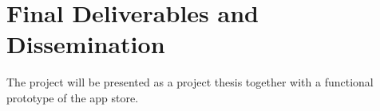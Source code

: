 \section{Final Deliverables and Dissemination}

The project will be presented as a project thesis together with a functional prototype of the app store.